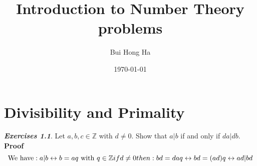 \documentclass[11pt]{article}
\title{Introduction to Number Theory problems}
\author{Bui Hong Ha}
\date{\today}
\begin{document}
\maketitle

\section{Divisibility and Primality}
\textbf{\textit{Exercises 1.1}}. Let $a, b, c \in \mathbb{Z}$ with $d \neq 0$. Show that $a|b$ if and only if $da|db$.
\textbf{Proof}\\
\begin{equation}
\mbox{We have}: a|b \leftrightarrow b = aq \mbox{ with } q \in \mathbb{Z} \\
if d \neq 0 then: \\
bd = daq \leftrightarrow bd = (ad)q \leftrightarrow ad|bd
\end{equation}
\end{document}

